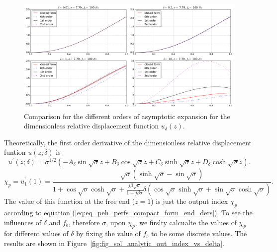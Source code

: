 \documentclass{article}
\begin{document}
\begin{figure}[!htbp]
    \centering
    \includegraphics[width=\textwidth]{./img_eig_asy/fig_sol_analytic_disp_cmp_fr100}
    \caption{Comparison for the different orders of asymptotic expansion for the dimensionless relative displacement function $u_\delta(z)$.}
    \label{fig:fig_sol_analytic_disp_cmp_fr100}
\end{figure}


Theoretically, the first order derivative of the dimensionless relative displacement funtion $u(z;\delta)$ is 
\begin{equation}
    u^{\prime}(z;\delta) = \sigma^{1/2} \left( - A_\delta \sin{\sqrt{\sigma}z} + B_\delta \cos{\sqrt{\sigma}z} + C_\delta \sinh{\sqrt{\sigma}z} + D_\delta \cosh{\sqrt{\sigma}z} \right).
\end{equation}
\begin{equation}
    \chi_p = u_1^\prime(1) = \frac{ \sqrt{\sigma} \left( \sinh\sqrt{\sigma} - \sin\sqrt{\sigma} \right) }{ 1 + \cos\sqrt{\sigma } \cosh\sqrt{\sigma } + \frac{j \beta \sqrt{\sigma}}{ 1+ j \beta \sigma } \delta \left( \cos\sqrt{\sigma } \sinh\sqrt{\sigma } + \sin\sqrt{\sigma } \cosh\sqrt{\sigma } \right) }.
    \label{eq:eq_peh_perfs_compact_form_end_ders1}
\end{equation}
The value of this function at the free end ($z=1$) is just the output index $\chi_p$ according to equation (\ref{eq:eq_peh_perfs_compact_form_end_ders}). To see the influences of $\delta$ and $f_b$, therefore $\sigma$, upon $\chi_p$, we firslty calcualte the values of $\chi_p$ for different values of $\delta$ by fixing the value of $f_b$ to be some discrete values. The results are shown in Figure~\ref{fig:fig_sol_analytic_out_index_vs_delta}. 
\end{document}
